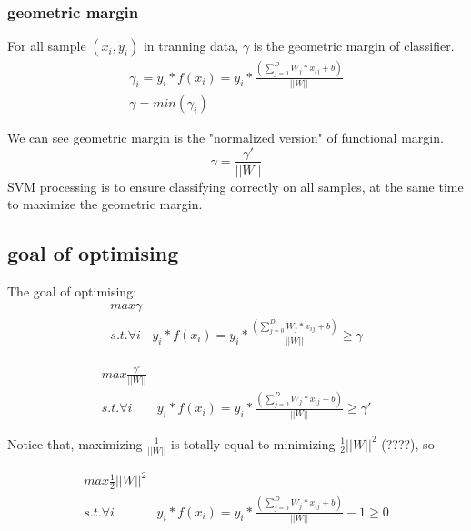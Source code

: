 \documentclass[11pt]{article}
\begin{document}
\subsubsection{geometric margin}
For all sample $(x_i,y_i)$ in tranning data, $\gamma$ is the geometric margin of classifier.
\begin{equation}
\begin{array}{lr}
\gamma_i = y_i * f(x_i) = y_i * \frac{(\sum_{j=0}^{D}W_j * x_{ij} + b)}{||W||} \\
\gamma = min(\gamma_i)
\end{array}
\end{equation}

We can see geometric margin is the "normalized version" of functional margin.
\begin{equation}
\gamma = \frac{{\gamma}'}{||W||}
\end{equation}
SVM processing is to ensure classifying correctly on all samples, at the same time to maximize the geometric margin.

\subsection{goal of optimising}
The goal of optimising:
\begin{equation}
\begin{array}{lr}
max  \gamma  \\
s.t.   \forall i & y_i * f(x_i) = y_i * \frac{(\sum_{j=0}^{D}W_j * x_{ij} + b)}{||W||} \geq  \gamma
\end{array}
\end{equation}

\begin{equation}
\begin{array}{lr}
max  \frac{{\gamma}'}{||W||}  \\
s.t.   \forall i & y_i * f(x_i) = y_i * \frac{(\sum_{j=0}^{D}W_j * x_{ij} + b)}{||W||} \geq  {\gamma}'
\end{array}
\end{equation}

Notice that, maximizing $\frac{1}{||W||}$ is totally equal to minimizing $\frac{1}{2} ||W||^2$ (????), so

\begin{equation}
\begin{array}{ll}
max  \frac{1}{2} ||W||^2  \\
s.t.   \forall i & y_i * f(x_i) = y_i * \frac{(\sum_{j=0}^{D}W_j * x_{ij} + b)}{||W||} - 1 \geq  0
\end{array}
\end{equation}
\end{document}
